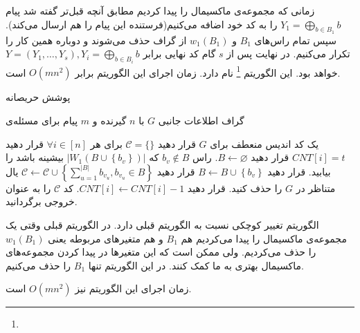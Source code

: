 زمانی که مجموعه‌ی ماکسیمال را پیدا کردیم مطابق آنچه قبل‌تر گفته شد پیام
 $Y_1 = \bigoplus\limits_{b \in B_1} b$
 را به کد خود اضافه می‌کنیم(فرستنده این پیام را هم ارسال می‌کند). سپس تمام راس‌های
 $B_1$
 و
 $w_1(B_1)$
 از گراف حذف می‌شوند و دوباره همین کار را تکرار می‌کنیم. در نهایت پس از 
 $s$
 گام کد نهایی برابر
 $Y = (Y_1, \ldots, Y_s), Y_i =  \bigoplus\limits_{b \in B_i} b$
 خواهد بود. این الگوریتم
 \GRCOVone\footnote{}
 	نام دارد. زمان اجرای این الگوریتم برابر
 	$O(mn^2)$
 	است.
 	\begin{algorithm}
 		\caption[
 		پوشش حریصانه
 		]{
 			پوشش حریصانه
 			\cite{pliable2015paper}}
 		\label{algorithm:grcov}
 		\begin{algorithmic}[1]
 			\Require
 			گراف اطلاعات جانبی
 			$G$
 			با
 			$n$
 			گیرنده و
 			$m$
 			پیام برای مسئله‌ی
 			
 			\Ensure
 			یک کد اندیس منعطف برای
 			$G$
 			\State 
 			قرار دهید
 			$\mathcal{C} = \{\}$
 			\State برای هر
 			 $\forall i \in [n]$
 			 قرار دهید
 			 $CNT[i] = t$ 
		 			\State
		 			قرار دهید
		 			 $B \leftarrow \varnothing$.
				 			\State
				 			راس
				 			 $b_v \notin B$ 
				 			 که
				 			 $\left|W_1\left(B \cup\left\{b_v\right\}\right)\right|$
				 			 بیشینه باشد را بیابید.
				 			\State قرار دهید
				 			$B \leftarrow B \cup\left\{b_v\right\}$
		 			\EndWhile
		 			\State قرار دهید
		 			 $\mathcal{C} \leftarrow \mathcal{C} \cup\left\{\sum_{u=1}^{|B|} b_{v_u}, b_{v_u} \in B\right\}$
		 	\State یال متناظر در
		 	 $G$
		 	 را حذف کنید.
		 	 \EndIf
		 			\State قرار دهید $CNT[i] \leftarrow CNT[i]-1$.
		 			\EndFor
 			\EndWhile
 			\State کد
 			 $\mathcal{C}$
 			 را به عنوان خروجی برگردانید.
 		\end{algorithmic}
 	\end{algorithm}

 الگوریتم
 	تغییر کوچکی نسبت به الگوریتم قبلی دارد. در الگوریتم قبلی وقتی یک مجموعه‌ی ماکسیمال را پیدا می‌کردیم هم
 $B_1$
 و هم متغیرهای مربوطه یعنی
 $w_1(B_1)$
 را حذف می‌کردیم. ولی ممکن است که این متغیرها در پیدا کردن مجموعه‌های ماکسیمال بهتری به ما کمک کنند. در این الگوریتم تنها
 $B_1$
 را حذف می‌کنیم.
 
 زمان اجرای این الگوریتم نیز
 $O(mn^2)$
 است.
